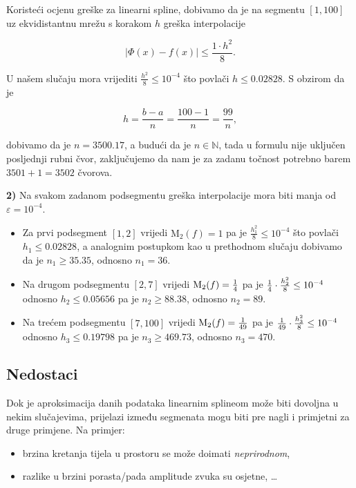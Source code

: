 Koristeći ocjenu greške za linearni spline, dobivamo da je na segmentu $[1, 100]$ uz ekvidistantnu mrežu s
korakom $h$ greška interpolacije

$$
|\Phi(x)-f(x)|\leq\frac{1\cdot h^2}{8}.
$$

U našem slučaju mora vrijediti $\displaystyle\frac{h^2}{8}\leq 10^{-4}$ što povlači $h\leq0.02828$.
S obzirom da je

$$
h=\frac{b-a}{n}=\frac{100-1}{n}=\frac{99}{n},
$$

dobivamo da je $n=3500.17$, a budući da je $n\in\mathbb{N}$, tada u formulu nije uključen posljednji rubni čvor, zaključujemo da nam je za zadanu točnost potrebno barem $3501+1=3502$ čvorova.

\bigskip

\textbf{2)} Na svakom zadanom podsegmentu greška interpolacije mora biti manja od $\varepsilon=10^{-4}$.

\begin{itemize}
    \item Za prvi podsegment $[1,2]$ vrijedi $\text{M}_2(f) = 1$ pa je $\frac{h_1^2}{8}\leq10^{-4}$ što povlači $h_1\leq0.02828$, a analognim postupkom kao u prethodnom slučaju dobivamo da je $n_1\geq35.35$, odnosno $n_1=36$.
    \item Na drugom podsegmentu $[2,7]$ vrijedi $\text{M}_2(f) = {1\over4}$ pa je ${1\over4}\cdot\frac{h_2^2}{8}\leq10^{-4}$ odnosno $h_2\leq0.05656$ pa je $n_2\geq88.38$, odnosno $n_2=89$.
    \item Na trećem podsegmentu $[7,100]$ vrijedi $\text{M}_2(f) = {1\over49}$ pa je ${1\over49}\cdot\frac{h_3^2}{8}\leq10^{-4}$ odnosno $h_3\leq0.19798$ pa je $n_3\geq469.73$, odnosno $n_3=470$.
\end{itemize}

\subsection{Nedostaci}

Dok je aproksimacija danih podataka linearnim splineom može biti dovoljna u nekim slučajevima, prijelazi između segmenata mogu biti pre nagli i primjetni za druge primjene. Na primjer:

\begin{itemize}
    \item brzina kretanja tijela u prostoru se može doimati \textit{neprirodnom},
    \item razlike u brzini porasta/pada amplitude zvuka su osjetne, \dots
\end{itemize}
